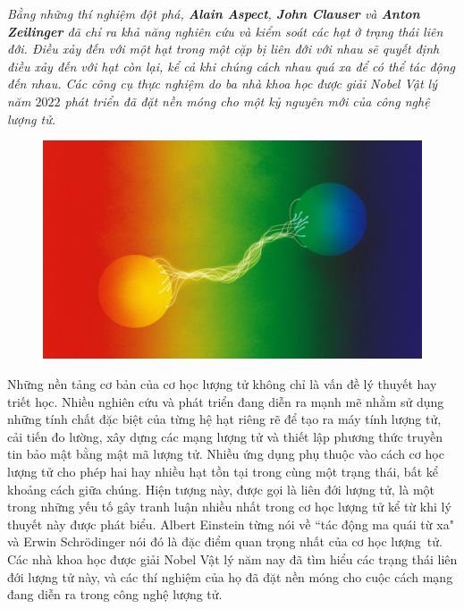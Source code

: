 \begin{multicols}{2}
	\textit{Bằng những thí nghiệm đột phá, \textbf{\color{timhieukhoahoc}Alain Aspect}, \textbf{\color{timhieukhoahoc}John Clauser} và \textbf{\color{timhieukhoahoc}Anton Zeilinger} đã chỉ ra khả năng nghiên cứu và kiểm soát các hạt ở trạng thái liên đới. Điều xảy đến với một hạt trong một cặp bị liên đới với nhau sẽ quyết định điều xảy đến với hạt còn lại, kể cả khi chúng cách nhau quá xa để có thể tác động đến nhau. Các công cụ thực nghiệm do ba nhà khoa học được giải Nobel Vật lý năm $2022$ phát triển đã đặt nền móng cho một kỷ nguyên mới của công nghệ lượng tử.}
	\begin{figure}[H]
		\vspace*{-5pt}
		\centering
		\captionsetup{labelformat= empty, justification=centering}
		\includegraphics[width= 1\linewidth]{7}
		\vspace*{-20pt}
	\end{figure}
	Những nền tảng cơ bản của cơ học lượng tử không chỉ là vấn đề lý thuyết hay triết học. Nhiều nghiên cứu và phát triển đang diễn ra mạnh mẽ nhằm sử dụng những tính chất đặc biệt của từng hệ hạt riêng rẽ để tạo ra máy tính lượng tử, cải tiến đo lường, xây dựng các mạng lượng tử và thiết lập phương thức truyền tin bảo mật bằng mật mã lượng tử.
	\vskip 0.1cm
	Nhiều ứng dụng phụ thuộc vào cách cơ học lượng tử cho phép hai hay nhiều hạt tồn tại trong cùng một trạng thái, bất kể khoảng cách giữa chúng. Hiện tượng này, được gọi là liên đới lượng tử, là một trong những yếu tố gây tranh luận nhiều nhất trong cơ học lượng tử kể từ khi lý thuyết này được phát biểu. Albert Einstein từng nói về ``tác động ma quái từ xa" và Erwin Schrödinger nói đó là đặc điểm quan trọng nhất của cơ học lượng~tử.
	\vskip 0.1cm
	Các nhà khoa học được giải Nobel Vật lý năm nay đã tìm hiểu các trạng thái liên đới lượng tử này, và các thí nghiệm của họ đã đặt nền móng cho cuộc cách mạng đang diễn ra trong công nghệ lượng tử.

\end{multicols}
